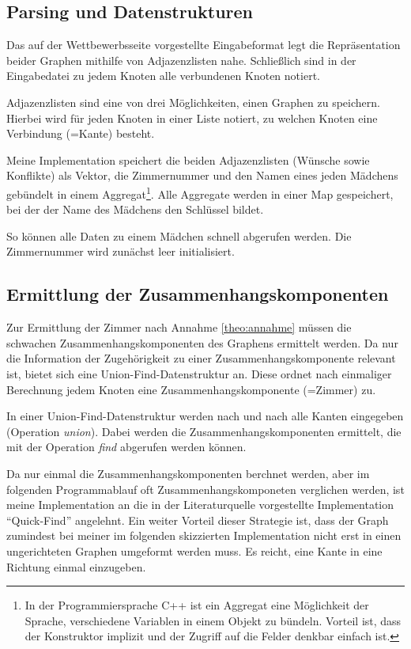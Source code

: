 \subsection{Parsing und Datenstrukturen}
Das auf der Wettbewerbsseite vorgestellte Eingabeformat legt die Repräsentation
beider Graphen mithilfe von Adjazenzlisten nahe.
Schließlich sind in der Eingabedatei zu jedem Knoten alle verbundenen Knoten notiert.

Adjazenzlisten sind eine von drei Möglichkeiten, einen Graphen zu speichern. Hierbei wird 
für jeden Knoten in einer Liste notiert, zu welchen Knoten eine Verbindung (=Kante)
besteht.

Meine Implementation speichert die beiden Adjazenzlisten (Wünsche sowie Konflikte)
als Vektor, die Zimmernummer und den Namen eines jeden Mädchens gebündelt in einem
Aggregat\footnote{In der Programmiersprache C++ ist ein Aggregat eine Möglichkeit der
Sprache, verschiedene Variablen in einem Objekt zu bündeln. Vorteil ist, dass der
Konstruktor implizit und der Zugriff auf die Felder denkbar einfach ist.}.
Alle Aggregate werden in einer Map gespeichert, bei der der Name des Mädchens den 
Schlüssel bildet.

So können alle Daten zu einem Mädchen schnell abgerufen werden.
Die Zimmernummer wird zunächst leer initialisiert.

\subsection{Ermittlung der Zusammenhangskomponenten}
Zur Ermittlung der Zimmer nach Annahme \ref{theo:annahme} müssen die schwachen
Zusammenhangskomponenten des Graphens ermittelt werden. 
Da nur die Information der Zugehörigkeit zu einer Zusammenhangskomponente relevant ist,
bietet sich eine Union-Find-Datenstruktur\autocite[S. 238]{Sedgewick2014} an.
Diese ordnet nach einmaliger Berechnung jedem Knoten eine
Zusammenhangskomponente (=Zimmer) zu.

In einer Union-Find-Datenstruktur werden nach und nach alle Kanten eingegeben
(Operation \textit{union}). Dabei werden die Zusammenhangskomponenten ermittelt, die
mit der Operation \textit{find} abgerufen werden können.

Da nur einmal die Zusammenhangskomponenten berchnet werden, aber im folgenden
Programmablauf oft Zusammenhangskomponeten verglichen werden, 
ist meine Implementation an die in der Literaturquelle vorgestellte Implementation 
"`Quick-Find"'\autocite[S. 245]{Sedgewick2014} angelehnt.
Ein weiter Vorteil dieser Strategie ist, dass der Graph zumindest bei meiner
im folgenden skizzierten Implementation nicht erst in einen ungerichteten Graphen
umgeformt werden muss.
Es reicht, eine Kante in eine Richtung einmal einzugeben.

